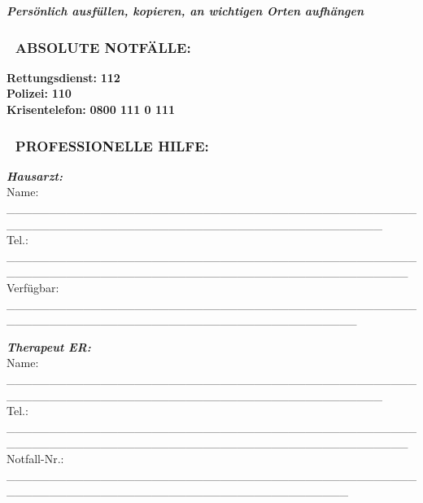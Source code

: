 \emph{\textbf{Persönlich ausfüllen, kopieren, an wichtigen Orten aufhängen}}

\hypertarget{absolute-notfuxe4lle}{%
\subsubsection{\texorpdfstring{\textbf{🚨 ABSOLUTE NOTFÄLLE:}}{🚨 ABSOLUTE NOTFÄLLE:}}\label{absolute-notfuxe4lle}}

\textbf{Rettungsdienst:} \textbf{112}\\
\textbf{Polizei:} \textbf{110}\\
\textbf{Krisentelefon:} \textbf{0800 111 0 111}

\hypertarget{professionelle-hilfe}{%
\subsubsection{\texorpdfstring{\textbf{🏥 PROFESSIONELLE HILFE:}}{🏥 PROFESSIONELLE HILFE:}}\label{professionelle-hilfe}}

\emph{\textbf{Hausarzt:}}\\
Name: \_\_\_\_\_\_\_\_\_\_\_\_\_\_\_\_\_\_\_\_\_\_\_\_\_\_\_\_\_\_\_\_\_\_\_\_\_\_\_\_\_\_\_\_\_\_\_\_\_\_\_\_\_\_\_\_\_\_\_\_\_\_\_\_\_\_\_\_\_\_\_\_\_\_\_\_\_\_\_\_\_\_\_\_\_\_\_\_\_\_\_\_\\
Tel.: \_\_\_\_\_\_\_\_\_\_\_\_\_\_\_\_\_\_\_\_\_\_\_\_\_\_\_\_\_\_\_\_\_\_\_\_\_\_\_\_\_\_\_\_\_\_\_\_\_\_\_\_\_\_\_\_\_\_\_\_\_\_\_\_\_\_\_\_\_\_\_\_\_\_\_\_\_\_\_\_\_\_\_\_\_\_\_\_\_\_\_\_\_\_\_\\
Verfügbar: \_\_\_\_\_\_\_\_\_\_\_\_\_\_\_\_\_\_\_\_\_\_\_\_\_\_\_\_\_\_\_\_\_\_\_\_\_\_\_\_\_\_\_\_\_\_\_\_\_\_\_\_\_\_\_\_\_\_\_\_\_\_\_\_\_\_\_\_\_\_\_\_\_\_\_\_\_\_\_\_\_\_\_\_\_\_\_\_\_

\emph{\textbf{Therapeut ER:}}\\
Name: \_\_\_\_\_\_\_\_\_\_\_\_\_\_\_\_\_\_\_\_\_\_\_\_\_\_\_\_\_\_\_\_\_\_\_\_\_\_\_\_\_\_\_\_\_\_\_\_\_\_\_\_\_\_\_\_\_\_\_\_\_\_\_\_\_\_\_\_\_\_\_\_\_\_\_\_\_\_\_\_\_\_\_\_\_\_\_\_\_\_\_\_\\
Tel.: \_\_\_\_\_\_\_\_\_\_\_\_\_\_\_\_\_\_\_\_\_\_\_\_\_\_\_\_\_\_\_\_\_\_\_\_\_\_\_\_\_\_\_\_\_\_\_\_\_\_\_\_\_\_\_\_\_\_\_\_\_\_\_\_\_\_\_\_\_\_\_\_\_\_\_\_\_\_\_\_\_\_\_\_\_\_\_\_\_\_\_\_\_\_\_\\
Notfall-Nr.: \_\_\_\_\_\_\_\_\_\_\_\_\_\_\_\_\_\_\_\_\_\_\_\_\_\_\_\_\_\_\_\_\_\_\_\_\_\_\_\_\_\_\_\_\_\_\_\_\_\_\_\_\_\_\_\_\_\_\_\_\_\_\_\_\_\_\_\_\_\_\_\_\_\_\_\_\_\_\_\_\_\_\_\_\_\_\_\_

